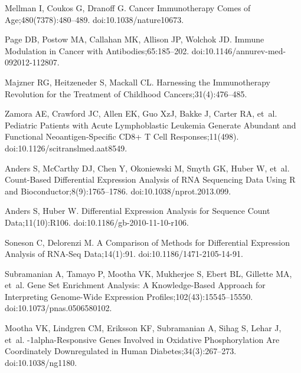 \documentclass[10pt,letterpaper]{article}
\begin{document}
\begin{thebibliography}{10}
	Mellman I, Coukos G, Dranoff G.
	\newblock Cancer Immunotherapy Comes of Age;480(7378):480--489.
	\newblock doi:{10.1038/nature10673}.
	
	Page DB, Postow MA, Callahan MK, Allison JP, Wolchok JD.
	\newblock Immune Modulation in Cancer with Antibodies;65:185--202.
	\newblock doi:{10.1146/annurev-med-092012-112807}.
	
	Majzner RG, Heitzeneder S, Mackall CL.
	\newblock Harnessing the Immunotherapy Revolution for the Treatment of
	Childhood Cancers;31(4):476--485.
	
	Zamora AE, Crawford JC, Allen EK, Guo XzJ, Bakke J, Carter RA, et~al.
	\newblock Pediatric Patients with Acute Lymphoblastic Leukemia Generate
	Abundant and Functional Neoantigen-Specific {{CD8}}+ {{T}} Cell
	Responses;11(498).
	\newblock doi:{10.1126/scitranslmed.aat8549}.
	
	Anders S, McCarthy DJ, Chen Y, Okoniewski M, Smyth GK, Huber W, et~al.
	\newblock Count-Based Differential Expression Analysis of {{RNA}} Sequencing
	Data Using {{R}} and {{Bioconductor}};8(9):1765--1786.
	\newblock doi:{10.1038/nprot.2013.099}.
	
	Anders S, Huber W.
	\newblock Differential Expression Analysis for Sequence Count Data;11(10):R106.
	\newblock doi:{10.1186/gb-2010-11-10-r106}.
	
	Soneson C, Delorenzi M.
	\newblock A Comparison of Methods for Differential Expression Analysis of
	{{RNA}}-Seq Data;14(1):91.
	\newblock doi:{10.1186/1471-2105-14-91}.
	
	Subramanian A, Tamayo P, Mootha VK, Mukherjee S, Ebert BL, Gillette MA, et~al.
	\newblock Gene Set Enrichment Analysis: A Knowledge-Based Approach for
	Interpreting Genome-Wide Expression Profiles;102(43):15545--15550.
	\newblock doi:{10.1073/pnas.0506580102}.
	
	Mootha VK, Lindgren CM, Eriksson KF, Subramanian A, Sihag S, Lehar J, et~al.
	-1alpha-Responsive Genes Involved in Oxidative Phosphorylation
	Are Coordinately Downregulated in Human Diabetes;34(3):267--273.
	\newblock doi:{10.1038/ng1180}.
	

\end{thebibliography}
\end{document}
